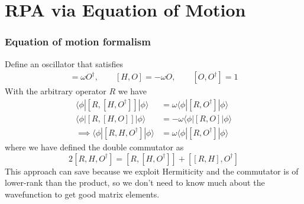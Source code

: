 \documentclass{beamer}
\begin{document}
\section{RPA via Equation of Motion}
\begin{frame}
    \frametitle{Equation of motion formalism}
Define an oscillator that satisfies 
\begin{align}
    [H, O^\dag] = \omega O^\dag , \quad  \quad [H, O] = -\omega O , \quad \quad [O, O^\dag] = 1
\end{align}
With the arbitrary operator $R$ we have
\begin{align}
\langle \phi | [R,[H, O^\dagger]] | \phi \rangle &= \omega \langle \phi | [R, O^\dagger] | \phi \rangle\\
\langle \phi | [R,[H, O]] | \phi \rangle 
    &= -\omega \langle \phi | [R, O] | \phi \rangle\\
    \implies\langle\phi|\left[R, H, O^{\dagger}\right]|\phi\rangle&=\omega\langle\phi|\left[R, O^{\dagger}\right]|\phi\rangle
\label{duble_commutator}
\end{align}
where we have defined the double commutator as
\begin{equation}
    2\left[R, H, O^{\dagger}\right]=\left[R,\left[H, O^{\dagger}\right]\right]+\left[[R, H], O^{\dagger}\right] 
\end{equation}
This approach can save because we exploit Hermiticity and the commutator is of lower-rank than the product, so we don't need to know much about the wavefunction to get good matrix elements.
\end{frame}
\end{document}
